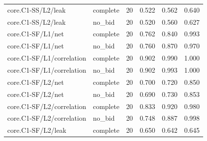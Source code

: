 \begin{longtable}{@{}p{2.2in}lrrrr@{}}
core.\allowbreak C1-SS/\allowbreak L2/\allowbreak leak & complete & 20 & 0.522 & 0.562 & 0.640\\
core.\allowbreak C1-SS/\allowbreak L2/\allowbreak leak & no\_\allowbreak bid & 20 & 0.520 & 0.560 & 0.627\\
core.\allowbreak C1-SF/\allowbreak L1/\allowbreak net & complete & 20 & 0.762 & 0.840 & 0.993\\
core.\allowbreak C1-SF/\allowbreak L1/\allowbreak net & no\_\allowbreak bid & 20 & 0.760 & 0.870 & 0.970\\
core.\allowbreak C1-SF/\allowbreak L1/\allowbreak correlation & complete & 20 & 0.902 & 0.990 & 1.000\\
core.\allowbreak C1-SF/\allowbreak L1/\allowbreak correlation & no\_\allowbreak bid & 20 & 0.902 & 0.993 & 1.000\\
core.\allowbreak C1-SF/\allowbreak L2/\allowbreak net & complete & 20 & 0.700 & 0.720 & 0.850\\
core.\allowbreak C1-SF/\allowbreak L2/\allowbreak net & no\_\allowbreak bid & 20 & 0.690 & 0.730 & 0.853\\
core.\allowbreak C1-SF/\allowbreak L2/\allowbreak correlation & complete & 20 & 0.833 & 0.920 & 0.980\\
core.\allowbreak C1-SF/\allowbreak L2/\allowbreak correlation & no\_\allowbreak bid & 20 & 0.748 & 0.887 & 0.998\\
core.\allowbreak C1-SF/\allowbreak L2/\allowbreak leak & complete & 20 & 0.650 & 0.642 & 0.645\\

\end{longtable}
